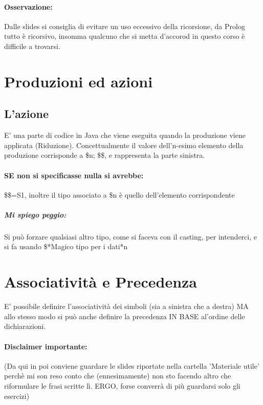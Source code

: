 \documentclass[12pt, a4paper, openany, twoside]{book}
\begin{document}
\paragraph{Osservazione: }Dalle slides si consiglia di evitare un uso eccessivo
 della ricorsione, da Prolog tutto è ricorsivo, insomma qualcuno che si metta 
 d'accorod in questo corso è difficile a trovarsi. 
 \section{Produzioni ed azioni}
 \subsection{L'azione }
 E' una parte di codice in Java che viene eseguita quando la produzione viene
 applicata (Riduzione).
 Concettualmente il valore dell'n-esimo elemento della produzione corrisponde
 a \$n; \$\$, e rappresenta la parte sinistra.
 \paragraph{SE non si specificasse nulla si avrebbe: } \$\$=S1,
 inoltre il tipo associato a \$n è quello dell'elemento corrispondente
 \subparagraph{Mi spiego peggio: } Si può forzare qualsiasi altro tipo, come
 si faceva con il casting, per intenderci, e si fa usando \$*Magico tipo per i
 dati*n
 \section{Associatività e Precedenza}
 E' possibile definire l'associatività dei simboli (sia a sinistra che a
 destra) MA allo stesso modo si può anche definire la precedenza IN BASE al'ordine
 delle dichiarazioni.
 \paragraph{Disclaimer importante: }
 (Da qui in poi conviene guardare le slides riportate nella cartella 
 'Materiale utile' perchè mi son reso conto che (ennesimamente) non sto facendo
 altro che riformulare le frasi scritte lì. ERGO, forse converrà di più guardarsi
 solo gli esercizi)
  	     	
     
\end{document}
